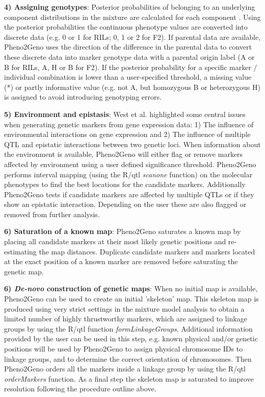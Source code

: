 {\bf 4) Assigning genotypes}:
Posterior probabilities of belonging to an underlying component distributions in the mixture are 
calculated for each component \cite{Jansen:2001b, Benaglia:2009}. Using the posterior probabilities 
the continuous phenotype values are converted into discrete data (e.g. 0 or 1 for RILs; 0, 1 or 2 
for F2). If parental data are available, Pheno2Geno uses the direction of the difference in the 
parental data to convert these discrete data into marker genotype data with a parental origin 
label (A or B for RILs, A, H or B for F2). If the posterior probability for a specific marker / 
individual combination is lower than a user-specified threshold, a missing value (*) or partly 
informative value (e.g. not A, but homozygous B or heterozygous H) is assigned to avoid introducing 
genotyping errors.

{\bf 5) Environment and epistasis}: 
West et al. \cite{West:2007} highlighted some central issues when generating genetic markers from 
gene expression data: 1) The influence of environmental interactions on gene expression and 2) The 
influence of multiple QTL and epistatic interactions between two genetic loci. When information 
about the environment is available, Pheno2Geno will either flag or remove markers affected by 
environment using a user defined significance threshold. Pheno2Geno performs interval mapping (using 
the R/qtl \emph{scanone} function) on the molecular phenotypes to find the best locations for the 
candidate markers. Additionally Pheno2Geno tests if candidate markers are affected by multiple QTLs 
or if they show an epistatic interaction. Depending on the user these are also flagged or removed 
from further analysis.

{\bf 6) Saturation of a known map}:
Pheno2Geno saturates a known map by placing all candidate markers at their most likely genetic 
positions and re-estimating the map distances. Duplicate candidate markers and markers located 
at the exact position of a known marker are removed before saturating the genetic map.

{\bf 6) \emph{De-novo} construction of genetic maps}: 
When no initial map is available, Pheno2Geno can be used to create an initial 'skeleton' map. 
This skeleton map is produced using very strict settings in the mixture model analysis to obtain 
a limited number of highly thrustworthy markers, which are assigned to linkage groups by using 
the R/qtl function \emph{formLinkageGroups}. Additional information provided by the user can be 
used in this step, e.g. known physical and/or genetic positions will be used by Pheno2Geno to 
assign physical chromosome IDs to linkage groups, and to determine the correct orientation of 
chromosomes. Then Pheno2Geno orders all the markers inside a linkage group by using the R/qtl 
\emph{orderMarkers} function. As a final step the skeleton map is saturated to improve resolution 
following the procedure outline above.

